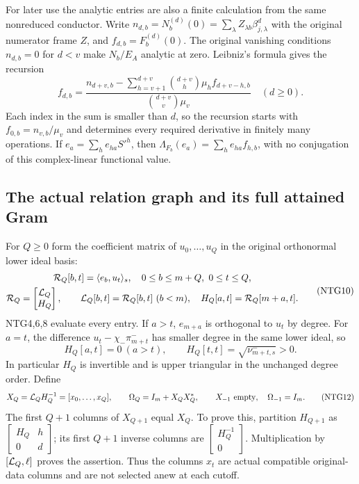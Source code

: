 \documentclass[11pt,a4paper]{article}
\begin{document}
For later use the analytic entries are also a finite calculation
from the same nonreduced conductor. Write
$n_{d,b}=N_b^{(d)}(0)=\sum_\lambda Z_{\lambda b}\beta_{j,\lambda}^d$
with the original numerator frame $Z$, and
$f_{d,b}=F_b^{(d)}(0)$. The original vanishing conditions
$n_{d,b}=0$ for $d<v$ make $N_b/E_A$ analytic at zero.
Leibniz's formula gives the recursion
\[
 f_{d,b}=
 \frac{n_{d+v,b}
       -\displaystyle\sum_{h=v+1}^{d+v}
              \binom{d+v}{h}\mu_h f_{d+v-h,b}}
      {\binom{d+v}{v}\mu_v}
       \quad(d\ge0).
                                                               \tag{NTG9}
\]
Each index in the sum is smaller than $d$, so the recursion
starts with $f_{0,b}=n_{v,b}/\mu_v$ and determines every required
derivative in finitely many operations. If $e_a=\sum_h e_{ha}S'^h$,
then $\Lambda_{F_b}(e_a)=\sum_h e_{ha}f_{h,b}$, with no
conjugation of this complex-linear functional value.

\subsection{The actual relation graph and its full attained Gram}
For $Q\ge0$ form the coefficient matrix of $u_0,\ldots,u_Q$
in the original orthonormal lower ideal basis:
\[
\begin{gathered}
 {\cal R}_Q[b,t]=\langle e_b,u_t\rangle_s,\quad
       0\le b\le m+Q,\ 0\le t\le Q,\\
 {\cal R}_Q=\begin{bmatrix}{\cal L}_Q\\ H_Q\end{bmatrix},
 \qquad {\cal L}_Q[b,t]={\cal R}_Q[b,t]\ (b<m),\quad
 H_Q[a,t]={\cal R}_Q[m+a,t].
\end{gathered}                                                    \tag{NTG10}
\]
NTG4,6,8 evaluate every entry. If $a>t$, $e_{m+a}$ is
orthogonal to $u_t$ by degree. For $a=t$, the difference
$u_t-\chi_-\pi_{m+t}^-$ has smaller degree in the same
lower ideal, so
\[
 H_Q[a,t]=0\ (a>t),\qquad
 H_Q[t,t]=\sqrt{\nu_{m+t,s}^-}>0.
                                                               \tag{NTG11}
\]
In particular $H_Q$ is invertible and is upper triangular
in the unchanged degree order. Define
\[
 X_Q={\cal L}_QH_Q^{-1}=[x_0,\ldots,x_Q],\qquad
 \Omega_Q=I_m+X_QX_Q^*,\qquad
 X_{-1}\text{ empty},\quad\Omega_{-1}=I_m.
                                                               \tag{NTG12}
\]
The first $Q+1$ columns of $X_{Q+1}$ equal $X_Q$. To prove
this, partition $H_{Q+1}$ as
$\left[\begin{smallmatrix}H_Q&h\\0&d\end{smallmatrix}\right]$;
its first $Q+1$ inverse columns are
$\left[\begin{smallmatrix}H_Q^{-1}\\0\end{smallmatrix}\right]$.
Multiplication by $[{\cal L}_Q,\ell]$ proves the assertion.
Thus the columns $x_t$ are actual compatible original-data
columns and are not selected anew at each cutoff.
\end{document}
